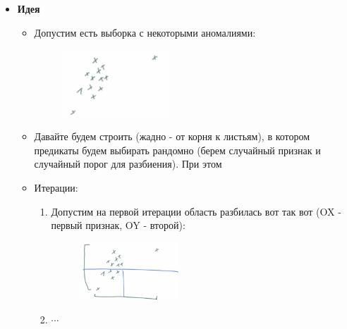             \begin{itemize}
                \item \colorbox{blue!20}{\textbf{Идея}}
                    \begin{itemize}
                        \item Допустим есть выборка с некоторыми аномалиями:
                        \begin{figure}[H]
                            \centering
                            \includegraphics[width=0.4\textwidth]{images/19lecture/isolation_forest.png}
                        \end{figure}

                        \item Давайте будем строить  (жадно - от корня к листьям), в котором предикаты будем выбирать рандомно (берем случайный признак и случайный порог для разбиения). При этом 


                        \item \colorbox{orange!30}{Итерации}:
                            \begin{enumerate}
                                \item Допустим на первой итерации область разбилась вот так вот (OX - первый признак, OY - второй):
                                \begin{figure}[H]
                                    \centering
                                    \includegraphics[width=0.4\textwidth]{images/19lecture/isolation_forest_iter_1.png}
                                \end{figure}

                                \item $\cdots$


\end{enumerate}
\end{itemize}
\end{itemize}
